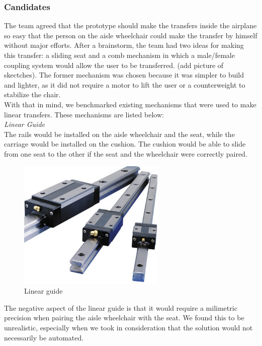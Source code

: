 \subsubsection{Candidates}
The team agreed that the prototype should make the transfers inside the airplane so easy that the person on the aisle wheelchair could make the transfer by himself without major efforts. After a brainstorm, the team had two ideas for making this transfer: a sliding seat and a comb mechanism in which a male/female coupling system would allow the user to be transferred. (add picture of skectches). The former mechanism was chosen because it was simpler to build and lighter, as it did not require a motor to lift the user or a counterweight to stabilize the chair. \\

With that in mind, we benchmarked existing mechanisms that were used to make linear transfers. These mechanisms are listed below: \\

\noindent\emph{Linear Guide}\\
The rails would be installed on the aisle wheelchair and the seat, while the carriage would be installed on the cushion. The cushion would be able to slide from one seat to the other if the seat and the wheelchair were correctly paired.

\begin{figure}[h]
\centering
\includegraphics[width=7cm]{brazil_images/image035.jpg}
\caption{Linear guide} %
\label{fig:linear_guide}
\end{figure}

The negative aspect of the linear guide is that it would require a milimetric precision when pairing the aisle wheelchair with the seat. We found this to be unrealistic, especially when we took in consideration that the solution would not necessarily be automated.


